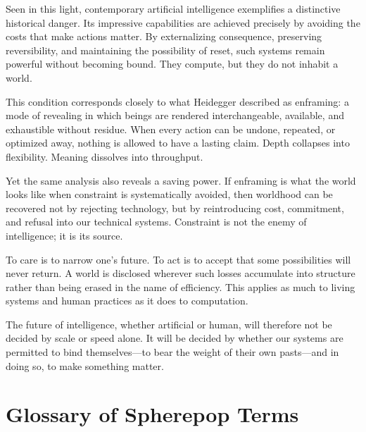 \documentclass[11pt]{article}
\begin{document}
Seen in this light, contemporary artificial intelligence exemplifies a distinctive historical danger. Its impressive capabilities are achieved precisely by avoiding the costs that make actions matter. By externalizing consequence, preserving reversibility, and maintaining the possibility of reset, such systems remain powerful without becoming bound. They compute, but they do not inhabit a world.

This condition corresponds closely to what Heidegger described as enframing: a mode of revealing in which beings are rendered interchangeable, available, and exhaustible without residue. When every action can be undone, repeated, or optimized away, nothing is allowed to have a lasting claim. Depth collapses into flexibility. Meaning dissolves into throughput.

Yet the same analysis also reveals a saving power. If enframing is what the world looks like when constraint is systematically avoided, then worldhood can be recovered not by rejecting technology, but by reintroducing cost, commitment, and refusal into our technical systems. Constraint is not the enemy of intelligence; it is its source.

To care is to narrow one’s future. To act is to accept that some possibilities will never return. A world is disclosed wherever such losses accumulate into structure rather than being erased in the name of efficiency. This applies as much to living systems and human practices as it does to computation.

The future of intelligence, whether artificial or human, will therefore not be decided by scale or speed alone. It will be decided by whether our systems are permitted to bind themselves—to bear the weight of their own pasts—and in doing so, to make something matter.

\section{Glossary of Spherepop Terms}
\end{document}
